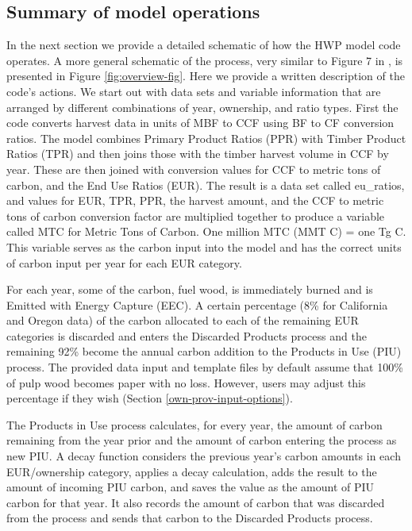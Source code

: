 \documentclass[
  openany]{book}
\begin{document}
\hypertarget{model-func-opp}{%
\subsection{Summary of model operations}\label{model-func-opp}}

In the next section we provide a detailed schematic of how the HWP model code operates. A more general schematic of the process, very similar to Figure 7 in \textcite{stockmann2012}, is presented in Figure \ref{fig:overview-fig}. Here we provide a written description of the code's actions. We start out with data sets and variable information that are arranged by different combinations of year, ownership, and ratio types. First the code converts harvest data in units of MBF to CCF using BF to CF conversion ratios. The model combines Primary Product Ratios (PPR) with Timber Product Ratios (TPR) and then joins those with the timber harvest volume in CCF by year. These are then joined with conversion values for CCF to metric tons of carbon, and the End Use Ratios (EUR). The result is a data set called eu\_ratios, and values for EUR, TPR, PPR, the harvest amount, and the CCF to metric tons of carbon conversion factor are multiplied together to produce a variable called MTC for Metric Tons of Carbon. One million MTC (MMT C) = one Tg C. This variable serves as the carbon input into the model and has the correct units of carbon input per year for each EUR category.

For each year, some of the carbon, fuel wood, is immediately burned and is Emitted with Energy Capture (EEC). A certain percentage (8\% for California and Oregon data) of the carbon allocated to each of the remaining EUR categories is discarded and enters the Discarded Products process and the remaining 92\% become the annual carbon addition to the Products in Use (PIU) process. The provided data input and template files by default assume that 100\% of pulp wood becomes paper with no loss. However, users may adjust this percentage if they wish (Section \ref{own-prov-input-options}).

The Products in Use process calculates, for every year, the amount of carbon remaining from the year prior and the amount of carbon entering the process as new PIU. A decay function considers the previous year's carbon amounts in each EUR/ownership category, applies a decay calculation, adds the result to the amount of incoming PIU carbon, and saves the value as the amount of PIU carbon for that year. It also records the amount of carbon that was discarded from the process and sends that carbon to the Discarded Products process.
\end{document}
